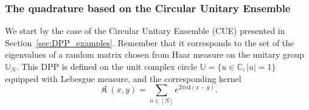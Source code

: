 \documentclass[twoside,11pt]{book}
\newtheorem{theorem}{Theorem}
\numberwithin{theorem}{chapter}
\numberwithin{definition}{chapter}
\numberwithin{proposition}{chapter}
\numberwithin{corollary}{chapter}
\numberwithin{example}{chapter}
\numberwithin{lemma}{chapter}
\numberwithin{assumption}{chapter}
\DeclareMathOperator*{\KDPP}{\mathfrak{K}}
\begin{document}
\subsubsection{The quadrature based on the Circular Unitary Ensemble}
We start by the case of the Circular Unitary Ensemble (CUE) presented in Section~\ref{sec:DPP_examples}. Remember that it corresponds to the set of the eigenvalues of a random matrix chosen from Haar measure on the unitary group $\mathbb{U}_{N}$. This DPP is defined on the unit complex circle $\mathbb{U} = \{ u \in \mathbb{C}, |u| =1 \}$ equipped with Lebesgue measure, and the corresponding kernel
\begin{equation}
\KDPP(x,y) = \sum\limits_{n \in [N]} e^{2 \pi n \mathbf{i}(x-y)}.
\end{equation}  






\end{document}
